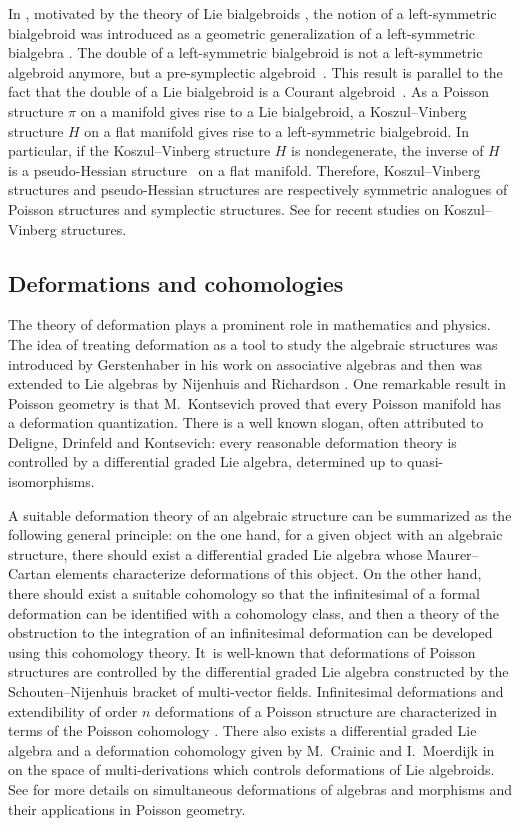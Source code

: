 \documentclass[10pt,a4paper]{amsart}
\numberwithin{equation}{section}
\begin{document}
 In \cite{lsb2}, motivated by the theory of Lie bialgebroids \cite{Lie-bialgebroid}, the notion of a left-symmetric bialgebroid was introduced as a geometric generalization of a left-symmetric bialgebra \cite{Left-symmetric-bialgebras}. The double of a left-symmetric bialgebroid is not a left-symmetric algebroid anymore, but a pre-symplectic algebroid~\cite{lsb}. This result is parallel to the fact that
 the double of a Lie bialgebroid is a Courant algebroid~\cite{lwx}. As a Poisson structure $\pi$ on a manifold gives rise to a Lie bialgebroid, a Koszul--Vinberg structure $H$ on a flat manifold gives rise to a left-symmetric bialgebroid. In particular, if the Koszul--Vinberg structure $H$ is nondegenerate, the inverse of $H$ is a pseudo-Hessian structure~\cite{Shima,Geometry-of-Hessian-structures} on a flat manifold.
 Therefore, Koszul--Vinberg structures and pseudo-Hessian structures are respectively symmetric analogues of Poisson structures and symplectic structures. See \cite{ABB,BBo, WLS} for recent studies on Koszul--Vinberg structures.

 \subsection{Deformations and cohomologies}
The theory of deformation plays a prominent role in mathematics and physics.
The idea of treating deformation as a tool to study the algebraic structures was introduced by Gerstenhaber in his work on associative algebras \cite{Gerstenhaber2,Gerstenhaber1} and then was extended to Lie algebras by Nijenhuis and Richardson \cite{NR1,NR3}. One remarkable
result in Poisson geometry is that M.~Kontsevich \cite{Kon} proved that every Poisson manifold has a deformation quantization. There is a well known slogan, often attributed to Deligne, Drinfeld and Kontsevich: every reasonable deformation theory is controlled by a differential graded Lie algebra, determined up to quasi-isomorphisms.

A suitable deformation theory of an algebraic structure can be summarized as the following general principle: on the one hand, for a given object with an algebraic structure, there should exist a differential graded Lie algebra whose Maurer--Cartan elements characterize deformations of this object. On the other hand, there should exist a suitable cohomology so that the infinitesimal of a formal deformation can be identified with a cohomology class, and then a theory of the obstruction to the integration of an infinitesimal deformation can be developed using this cohomology theory. It~is well-known that deformations of Poisson structures are controlled by the differential graded Lie algebra constructed by the Schouten--Nijenhuis bracket of multi-vector fields. Infinitesimal deformations and extendibility of order $n$ deformations of a Poisson structure are characterized in terms of the Poisson cohomology \cite{Hue, Lic}. There also exists a differential graded Lie algebra and a deformation cohomology given by M.~Crainic and I.~Moerdijk in \cite{deformation-cohomology-LA} on the space of multi-derivations which controls deformations of Lie algebroids. See \cite{FZ1,FZ2} for more details on simultaneous deformations of algebras and morphisms and their applications in Poisson geometry.
\end{document}
